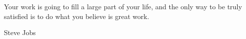 \quote

Your work is going to fill a large part of your life, and the only way to be truly satisfied is to do what you believe is great work.

\medskip

Steve Jobs

\endquote


